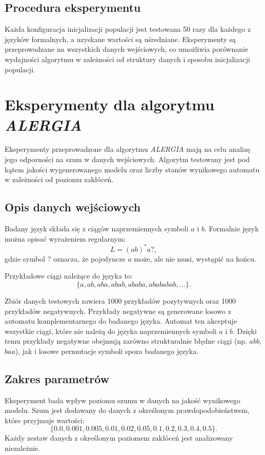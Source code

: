 \subsection{Procedura eksperymentu}  
Każda konfiguracja inicjalizacji populacji jest testowana 50 razy dla każdego z języków formalnych, a uzyskane wartości są uśredniane. Eksperymenty są przeprowadzane na wszystkich danych wejściowych, co umożliwia porównanie wydajności algorytmu w zależności od struktury danych i sposobu inicjalizacji populacji.  


\section{Eksperymenty dla algorytmu \textit{ALERGIA}}  
Eksperymenty przeprowadzone dla algorytmu \textit{ALERGIA} mają na celu analizę jego odporności na szum w danych wejściowych. Algorytm testowany jest pod kątem jakości wygenerowanego modelu oraz liczby stanów wynikowego automatu w zależności od poziomu zakłóceń.  

\subsection{Opis danych wejściowych}  
Badany język składa się z ciągów naprzemiennych symboli \( a \) i \( b \). Formalnie język można opisać wyrażeniem regularnym:  
\[
L = (ab)^* a?,
\]  
gdzie symbol \( ? \) oznacza, że pojedyncze \( a \) może, ale nie musi, wystąpić na końcu.  

Przykładowe ciągi należące do języka to:  
\[
\{a, ab, aba, abab, ababa, abababab, \ldots\}.
\]  

Zbiór danych testowych zawiera 1000 przykładów pozytywnych oraz 1000 przykładów negatywnych. Przykłady negatywne są generowane losowo z automatu komplementarnego do badanego języka. Automat ten akceptuje wszystkie ciągi, które nie należą do języka naprzemiennych symboli \( a \) i \( b \). Dzięki temu przykłady negatywne obejmują zarówno strukturalnie błędne ciągi (np. \( abb \), \( baa \)), jak i losowe permutacje symboli spoza badanego języka.  

\subsection{Zakres parametrów}  
Eksperyment bada wpływ poziomu szumu w danych na jakość wynikowego modelu. Szum jest dodawany do danych z określonym prawdopodobieństwem, które przyjmuje wartości:  
\[
\{0.0, 0.001, 0.005, 0.01, 0.02, 0.05, 0.1, 0.2, 0.3, 0.4, 0.5\}.
\]  
Każdy zestaw danych z określonym poziomem zakłóceń jest analizowany niezależnie.  

